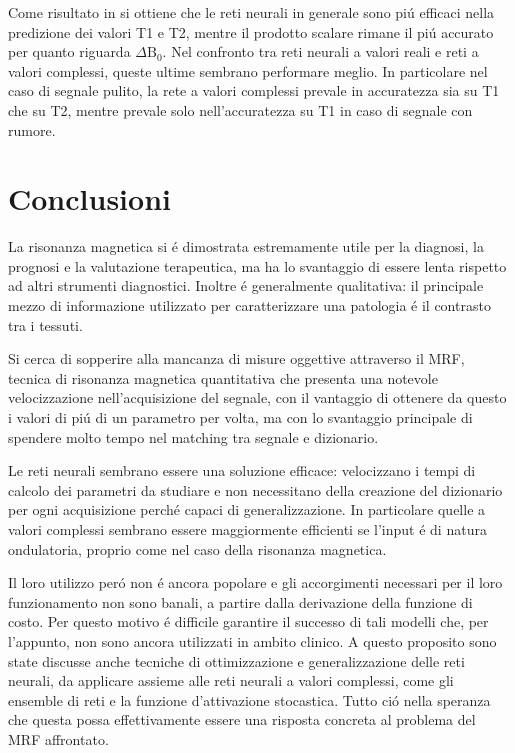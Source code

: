 \documentclass[a4paper,12pt]{report}
\begin{document}
 Come risultato in \cite{virtue2017better} si ottiene che le reti neurali in generale sono pi\'u efficaci nella predizione dei valori T1 e T2, mentre il prodotto scalare rimane il pi\'u accurato per quanto riguarda $\Delta\mbox{B}_0$. Nel confronto tra reti neurali a valori reali e reti a valori complessi, queste ultime sembrano performare meglio. In particolare nel caso di segnale pulito, la rete a valori complessi prevale in accuratezza sia su T1 che su T2, mentre prevale solo nell'accuratezza su T1 in caso di segnale con rumore.

 
 \chapter*{Conclusioni}
 
 La risonanza magnetica si \'e dimostrata estremamente utile per la diagnosi, la prognosi e la valutazione terapeutica, ma ha lo svantaggio di essere lenta rispetto ad altri strumenti diagnostici. 
 Inoltre \'e generalmente qualitativa: il principale mezzo di informazione utilizzato per caratterizzare una patologia \'e il contrasto tra i tessuti.
 
 Si cerca di sopperire alla mancanza di misure oggettive attraverso il MRF, tecnica di risonanza magnetica quantitativa che presenta una notevole velocizzazione nell'acquisizione del segnale, con il vantaggio di ottenere da questo i valori di pi\'u di un parametro per volta, ma con lo svantaggio principale di spendere molto tempo nel matching tra segnale e dizionario.
 
 Le reti neurali sembrano essere una soluzione efficace: velocizzano i tempi di calcolo dei parametri da studiare e non necessitano della creazione del dizionario per ogni acquisizione perch\'e capaci di generalizzazione. 
 In particolare quelle a valori complessi sembrano essere maggiormente efficienti se l'input \'e di natura ondulatoria, proprio come nel caso della risonanza magnetica.
 
 Il loro utilizzo per\'o non \'e ancora popolare e gli accorgimenti necessari per il loro funzionamento non sono banali, a partire dalla derivazione della funzione di costo.
 Per questo motivo \'e difficile garantire il successo di tali modelli che, per l'appunto, non sono ancora utilizzati in ambito clinico.
 A questo proposito sono state discusse anche tecniche di ottimizzazione e generalizzazione delle reti neurali, da applicare assieme alle reti neurali a valori complessi, come gli ensemble di reti e la funzione d'attivazione stocastica.
 Tutto ci\'o nella speranza che questa possa effettivamente essere una risposta concreta al problema del MRF affrontato.
 
 
 
 
\end{document}
